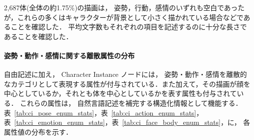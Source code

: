 \documentclass[a4j,12pt,dvipdfmx]{jsreport}
\begin{document}
2,687体(全体の約1.75\%)の描画は，
姿勢，行動，感情のいずれも空白であったが，これらの多くはキャラクターが背景として小さく描かれている場合などであることを確認した．
平均文字数もそれぞれの項目を記述するのに十分な長さであることを確認した．


\paragraph{姿勢・動作・感情に関する離散属性の分布}
自由記述に加え，
Character Instance ノードには，
姿勢・動作・感情を離散的なカテゴリとして表現する属性が付与されている．また加えて，その描画が顔を中心としているか，それとも体を中心としているかを表す属性も付与されている．
これらの属性は，
自然言語記述を補完する構造化情報として機能する．
表~\ref{tab:ci_pose_enum_stats}，表~\ref{tab:ci_action_enum_stats}，表~\ref{tab:ci_emotion_enum_stats}，表~\ref{tab:ci_face_body_enum_stats}，に，
各属性値の分布を示す．
\end{document}
